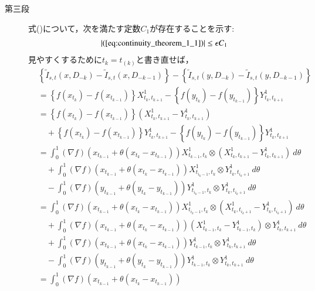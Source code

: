 \begin{prf}
\begin{description}
			\item[第三段]
				式()について，次を満たす定数$C_1$が存在することを示す:
				\begin{align}
					|(\refeq{eq:continuity_theorem_1_1})| \leq \epsilon C_1
					\label{eq:continuity_theorem_1_3}
				\end{align}
				見やすくするために$t_k = t_{(k)}$と書き直せば，
				\begin{align}
					&\left\{ \tilde{I}_{s,t}(x,D_{-k}) - \tilde{I}_{s,t}(x,D_{-k-1}) \right\} - 
						\left\{ \tilde{I}_{s,t}(y,D_{-k}) - \tilde{I}_{s,t}(y,D_{-k-1}) \right\} \\
					&=	\left\{ f(x_{t_k}) - f(x_{t_{k-1}}) \right\} X^1_{t_k,t_{k+1}}
						- \left\{ f(y_{t_k}) - f(y_{t_{k-1}}) \right\} Y^1_{t_k,t_{k+1}} \\
					&= \left\{ f(x_{t_k}) - f(x_{t_{k-1}}) \right\} \left( X^1_{t_k,t_{k+1}} - Y^1_{t_k,t_{k+1}} \right) \\
						&\quad +\left\{ f(x_{t_k}) - f(x_{t_{k-1}}) \right\} Y^1_{t_k,t_{k+1}} - \left\{ f(y_{t_k}) - f(y_{t_{k-1}}) \right\} Y^1_{t_k,t_{k+1}} \\
					&= \int_0^1 (\nabla f)( x_{t_{k-1}}+\theta ( x_{t_k}-x_{t_{k-1}} ))
						X^1_{t_{k-1},t_k} \otimes \left( X^1_{t_k,t_{k+1}} - Y^1_{t_k,t_{k+1}} \right)\ d\theta \\
						&\quad + \int_0^1 (\nabla f)( x_{t_{k-1}}+\theta ( x_{t_k}-x_{t_{k-1}} ))
						X^1_{t_{i_k-1},t_k} \otimes Y^1_{t_k,t_{i_k+1}}\ d\theta \\
						&\quad - \int_0^1 (\nabla f)( y_{t_{k-1}}+\theta ( y_{t_k}-y_{t_{k-1}} ))
						Y^1_{t_{i_k-1},t_k} \otimes Y^1_{t_k,t_{i_k+1}}\ d\theta \\
					&= \int_0^1 (\nabla f)( x_{t_{k-1}}+\theta ( x_{t_k}-x_{t_{k-1}} ))
						X^1_{t_{i_k-1},t_k} \otimes \left( X^1_{t_k,t_{i_k+1}} - Y^1_{t_k,t_{i_k+1}} \right)\ d\theta \\
						&\quad + \int_0^1 (\nabla f)( x_{t_{k-1}}+\theta ( x_{t_k}-x_{t_{k-1}} ))
						\left( X^1_{t_{k-1},t_k} - Y^1_{t_{k-1},t_k} \right) \otimes Y^1_{t_k,t_{k+1}}\ d\theta \\
						&\quad + \int_0^1 (\nabla f)( x_{t_{k-1}}+\theta ( x_{t_k}-x_{t_{k-1}} ))
						Y^1_{t_{k-1},t_k} \otimes Y^1_{t_k,t_{k+1}}\ d\theta \\
						&\quad - \int_0^1 (\nabla f)( y_{t_{k-1}}+\theta ( y_{t_k}-y_{t_{k-1}} ))
						Y^1_{t_{k-1},t_k} \otimes Y^1_{t_k,t_{k+1}}\ d\theta \\
					&= \int_0^1 (\nabla f)( x_{t_{k-1}}+\theta ( x_{t_k}-x_{t_{k-1}} ))

\end{align}
\end{description}
\end{prf}

